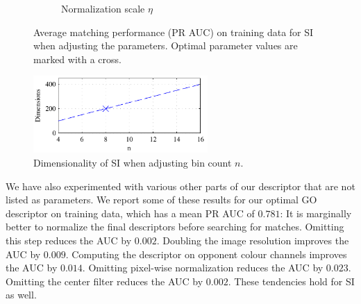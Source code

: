 \documentclass[thesis.tex]{subfiles}
\begin{document}
\begin{figure}[p]
{\begin{subfigure}[t]{0.593\textwidth}
		\caption{Normalization scale $\eta$}
		\label{fig:dtuParametersSi_normSigma}
		\vspace{2mm}
	\end{subfigure}}
	\caption{Average matching performance (PR AUC) on training data for SI when adjusting the parameters. Optimal parameter values are marked with a cross.}
	\label{fig:dtuParametersSiAuc}
	\vspace{1cm}
	\includegraphics[width=0.593\textwidth]{img/dtuParametersSi_binCountDims.pdf}
	\caption{Dimensionality of SI when adjusting bin count $n$.}
	\label{fig:dtuParametersSiDims}
\end{figure}
%
%
We have also experimented with various other parts of our descriptor that are not listed as parameters. We report some of these results for our optimal GO descriptor on training data, which has a mean PR AUC of $0.781$: It is marginally better to normalize the final descriptors before searching for matches. Omitting this step reduces the AUC by $0.002$. Doubling the image resolution improves the AUC by $0.009$. Computing the descriptor on opponent colour channels improves the AUC by $0.014$. Omitting pixel-wise normalization reduces the AUC by $0.023$. Omitting the center filter reduces the AUC by $0.002$. These tendencies hold for SI as well. 
%
\end{document}

